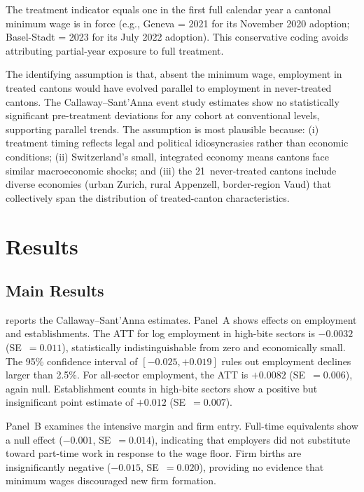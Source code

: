 \documentclass[12pt]{article}
\begin{document}
The treatment indicator equals one in the first full calendar year a cantonal minimum wage is in force (e.g., Geneva = 2021 for its November 2020 adoption; Basel-Stadt = 2023 for its July 2022 adoption). This conservative coding avoids attributing partial-year exposure to full treatment.

The identifying assumption is that, absent the minimum wage, employment in treated cantons would have evolved parallel to employment in never-treated cantons. The Callaway--Sant'Anna event study estimates show no statistically significant pre-treatment deviations for any cohort at conventional levels, supporting parallel trends. The assumption is most plausible because: (i) treatment timing reflects legal and political idiosyncrasies rather than economic conditions; (ii) Switzerland's small, integrated economy means cantons face similar macroeconomic shocks; and (iii) the 21~never-treated cantons include diverse economies (urban Zurich, rural Appenzell, border-region Vaud) that collectively span the distribution of treated-canton characteristics.

\section{Results}
\label{sec:results}

\subsection{Main Results}

 reports the Callaway--Sant'Anna estimates. Panel~A shows effects on employment and establishments. The ATT for log employment in high-bite sectors is $-0.0032$ (SE~$= 0.011$), statistically indistinguishable from zero and economically small. The 95\% confidence interval of $[-0.025, +0.019]$ rules out employment declines larger than 2.5\%. For all-sector employment, the ATT is $+0.0082$ (SE~$= 0.006$), again null. Establishment counts in high-bite sectors show a positive but insignificant point estimate of $+0.012$ (SE~$= 0.007$).

Panel~B examines the intensive margin and firm entry. Full-time equivalents show a null effect ($-0.001$, SE~$= 0.014$), indicating that employers did not substitute toward part-time work in response to the wage floor. Firm births are insignificantly negative ($-0.015$, SE~$= 0.020$), providing no evidence that minimum wages discouraged new firm formation.


\end{document}
